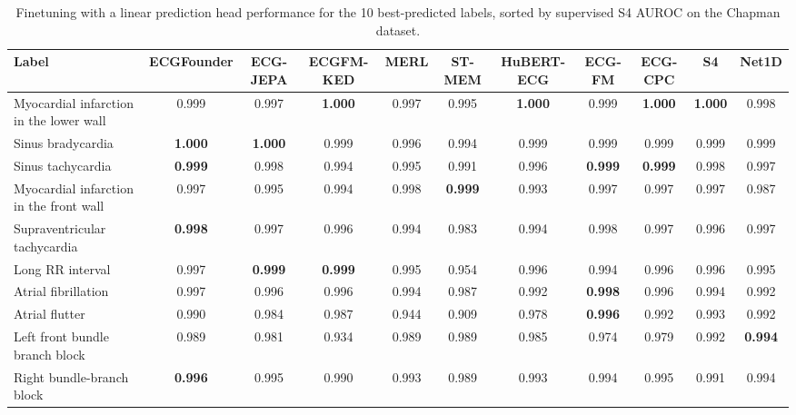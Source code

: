 \documentclass{article}
\begin{document}
                \begin{table}[htbp]
                    \centering
                    \tiny
                    \setlength{\tabcolsep}{2pt}
                    \caption{Finetuning with a linear prediction head performance for the 10 best-predicted labels, sorted by supervised S4 AUROC on the Chapman dataset.}
                    \begin{tabular}{lcccccccccc}
                        \toprule
                        \textbf{Label} & \textbf{ECGFounder} & \textbf{ECG-JEPA} & \textbf{ECGFM-KED} & \textbf{MERL} & \textbf{ST-MEM} & \textbf{HuBERT-ECG} & \textbf{ECG-FM} & \textbf{ECG-CPC} & \textbf{S4} & \textbf{Net1D} \\
                        \midrule
                        Myocardial infarction in the lower wall & 0.999 & 0.997 & \textbf{1.000} & 0.997 & 0.995 & \textbf{1.000} & 0.999 & \textbf{1.000} & \textbf{1.000} & 0.998 \\
                        Sinus bradycardia & \textbf{1.000} & \textbf{1.000} & 0.999 & 0.996 & 0.994 & 0.999 & 0.999 & 0.999 & 0.999 & 0.999 \\
                        Sinus tachycardia & \textbf{0.999} & 0.998 & 0.994 & 0.995 & 0.991 & 0.996 & \textbf{0.999} & \textbf{0.999} & 0.998 & 0.997 \\
                        Myocardial infarction in the front wall & 0.997 & 0.995 & 0.994 & 0.998 & \textbf{0.999} & 0.993 & 0.997 & 0.997 & 0.997 & 0.987 \\
                        Supraventricular tachycardia & \textbf{0.998} & 0.997 & 0.996 & 0.994 & 0.983 & 0.994 & 0.998 & 0.997 & 0.996 & 0.997 \\
                        Long RR interval & 0.997 & \textbf{0.999} & \textbf{0.999} & 0.995 & 0.954 & 0.996 & 0.994 & 0.996 & 0.996 & 0.995 \\
                        Atrial fibrillation & 0.997 & 0.996 & 0.996 & 0.994 & 0.987 & 0.992 & \textbf{0.998} & 0.996 & 0.994 & 0.992 \\
                        Atrial flutter & 0.990 & 0.984 & 0.987 & 0.944 & 0.909 & 0.978 & \textbf{0.996} & 0.992 & 0.993 & 0.992 \\
                        Left front bundle branch block & 0.989 & 0.981 & 0.934 & 0.989 & 0.989 & 0.985 & 0.974 & 0.979 & 0.992 & \textbf{0.994} \\
                        Right bundle-branch block & \textbf{0.996} & 0.995 & 0.990 & 0.993 & 0.989 & 0.993 & 0.994 & 0.995 & 0.991 & 0.994 \\
                        \bottomrule
                    \end{tabular}
                    \label{tab:results_overview_chapman}
                \end{table}
\end{document}
